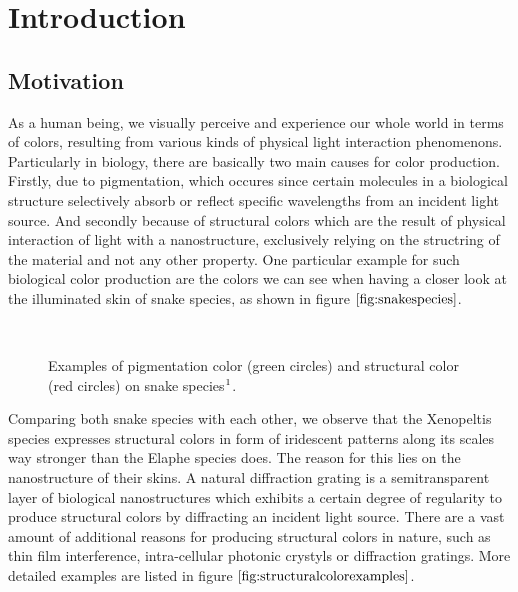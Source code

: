 \chapter{Introduction}
\section{Motivation}
As a human being, we visually perceive and experience our whole world in terms of colors, resulting from various kinds of physical light interaction phenomenons. Particularly in biology, there are basically two main causes for color production. Firstly, due to pigmentation, which occures since certain molecules in a biological structure selectively absorb or reflect specific wavelengths from an incident light source. And secondly because of structural colors which are the result of physical interaction of light with a nanostructure, exclusively relying on the structring of the material and not any other property. One particular example for such biological color production are the colors we can see when having a closer look at the illuminated skin of snake species, as shown in figure $\ref{fig:snakespecies}$.

\begin{figure}[H]
  \centering
~
  \caption[example biological color production]{Examples of pigmentation color (green circles) and structural color (red circles) on snake species$\footnotemark$.}
  \label{fig:snakespecies}
\end{figure}

Comparing both snake species with each other, we observe that the Xenopeltis species expresses structural colors in form of iridescent patterns along its scales way stronger than the Elaphe species does. The reason for this lies on the nanostructure of their skins. A natural diffraction grating is a semitransparent layer of biological nanostructures which exhibits a certain degree of regularity to produce structural colors by diffracting an incident light source. There are a vast amount of additional reasons for producing structural colors in nature, such as thin film interference, intra-cellular photonic crystyls or diffraction gratings. More detailed examples are listed in figure $\ref{fig:structuralcolorexamples}$. 

